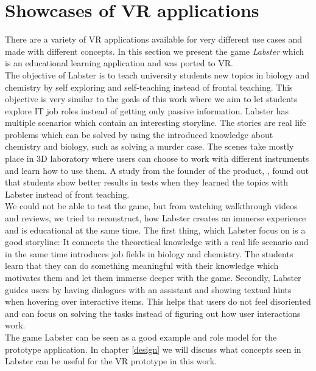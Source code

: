 \section{Showcases of VR applications}
There are a variety of VR applications available for very different use cases and made with different concepts. In this section we present the game \textit{Labster} which is an educational learning application and was ported to VR.\\
The objective of Labster is to teach university students new topics in biology and chemistry by self exploring and self-teaching instead of frontal teaching. This objective is very similar to the goals of this work where we aim to let students explore IT job roles instead of getting only passive information. Labster has multiple scenarios which contain an interesting storyline. The stories are real life problems which can be solved by using the introduced knowledge about chemistry and biology, such as solving a murder case. The scenes take mostly place in 3D laboratory where users can choose to work with different instruments and learn how to use them. A study from the founder of the product, , found out that students show better results in tests when they learned the topics with Labster instead of front teaching. \cite{Bodekaer.October2015} \\
We could not be able to test the game, but from watching walkthrough videos and reviews, we tried to reconstruct, how Labster creates an immerse experience and is educational at the same time.
The first thing, which Labster focus on is a good storyline: It connects the theoretical knowledge with a real life scenario and in the same time introduces job fields in biology and chemistry. The students learn that they can do something meaningful with their knowledge which motivates them and let them immerse deeper with the game. Secondly, Labster guides users by having dialogues with an assistant and showing textual hints when hovering over interactive items. This helps that users do not feel disoriented and can focus on solving the tasks instead of figuring out how user interactions work.\\
The game Labster can be seen as a good example and role model for the prototype application. In chapter \ref{design} we will discuss what concepts seen in Labster can be useful for the VR prototype in this work.
